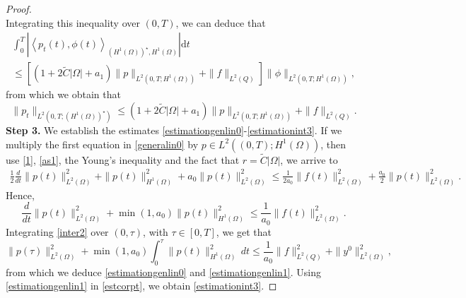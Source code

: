 \documentclass[reqno,twoside]{amsart}
\numberwithin{equation}{section}
\theoremstyle{definition}
\numberwithin{equation}{section}
\def \dis {\displaystyle}
\def \dt{\mathrm{d}t}
\begin{document}
\begin{proof}
$$$$
Integrating this inequality over $(0,T)$,  we can deduce that
\begin{equation} \label{estimationint3-1}
	\begin{array}{llll}
		\dis\int_0^T |\left\langle p_t(t),\phi(t)\right\rangle_{(H^1(\Omega))^\star,H^1(\Omega)}| \dt\\
		\leq \left[\left(1+2\tilde{C}|\Omega|+a_1\right)\|p\|_{L^2(0,T;H^1(\Omega))}+\|f\|_{L^2(Q)}\right]
		\|\phi\|_{L^2(0,T;H^1(\Omega))},
	\end{array}
\end{equation}
from which we obtain that
\begin{equation}\label{estcorpt}
	\dis \|p_t\|_{L^2(0,T;(H^1(\Omega))^\star)} \leq \left(1+2\tilde{C}|\Omega|+a_1\right)\|p\|_{L^2(0,T;H^1(\Omega))}+\|f\|_{L^2(Q)}.
\end{equation}
\noindent\textbf{Step 3.} We establish the estimates \eqref{estimationgenlin0}-\eqref{estimationint3}.
If we multiply the first equation in   \eqref{generalin0} by $p\in L^2((0,T);H^1(\Omega))$, then  use \eqref{1}, \eqref{as1}, the Young's inequality and the fact that $r=\tilde{C}|\Omega|$, we arrive to
$$\begin{array}{llll}
	\dis  \frac 12\frac{d}{dt}\|p(t)\|^2_{L^2(\Omega)}+\|p(t)\|^2_{H^1(\Omega)}+a_0\|p(t)\|^2_{L^2(\Omega)}
	\leq\frac{1}{2a_0}\|f(t)\|^2_{L^2(\Omega)}+\frac{a_0}{2}\|p(t)\|^2_{L^2(\Omega)}.
\end{array}
$$
Hence,
\begin{equation}\label{inter2}
	\frac{d}{dt}\|p(t)\|^2_{L^2(\Omega)}+\min(1,a_0)\|p(t)\|^2_{H^1(\Omega)}\leq \dis \frac{1}{a_0}\|f(t)\|^2_{L^2(\Omega)}.
\end{equation}
Integrating \eqref{inter2} over $(0,\tau)$, with $\tau\in [0,T]$, we get that
$$
\|p(\tau)\|^2_{L^2(\Omega)}+\min(1,a_0)\int_{0}^{\tau}\|p(t)\|^2_{H^1(\Omega)}\,dt\leq \frac{1}{a_0}\|f\|^2_{L^2(Q)}+\|y^0\|^2_{L^2(\Omega)},
$$
from which we deduce  \eqref{estimationgenlin0} and \eqref{estimationgenlin1}. Using \eqref{estimationgenlin1} in \eqref{estcorpt}, we obtain \eqref{estimationint3}.\par



\end{proof}
\end{document}
